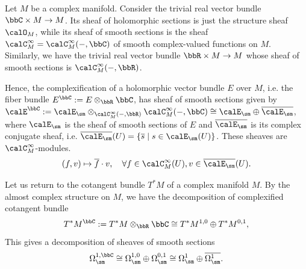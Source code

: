     \begin{example}\label{eg:real_trivial_bundle_C_as_sheaves}
        Let \(M\) be a complex manifold.
        Consider the trivial real vector bundle \(\bbC \times M \to M\).
        Its sheaf of holomorphic sections is just the structure sheaf \(\calO_M\),
        while its sheaf of smooth sections is the sheaf \(\calC_M^\infty = \calC_M^\infty(-,\bbC)\) of smooth complex-valued functions on \(M\).
        Similarly, we have the trivial real vector bundle \(\bbR \times M \to M\) whose sheaf of smooth sections is \(\calC_M^\infty(-,\bbR)\).

        Hence, the complexification of a holomorphic vector bundle \(E\) over \(M\), i.e. the fiber bundle \(E^\bbC := E \otimes_\bbR \bbC\),
        has sheaf of smooth sections given by \(\calE^\bbC := \calE_\sm \otimes_{\calC_M^\infty(-,\bbR)} \calC_M^\infty(-,\bbC) \cong \calE_\sm \oplus \overline{\calE_\sm}\),
        where \(\calE_\sm\) is the sheaf of smooth sections of \(E\) and \(\overline{\calE_\sm}\) is its complex conjugate sheaf, i.e. \(\overline{\calE_\sm}(U) = \{ \overline{s} \mid s \in \calE_\sm(U) \}\).
        These sheaves are \(\calC_M^\infty\)-modules.
        \[ (f, v) \mapsto \overline{f} \cdot v, \quad \forall f \in \calC_M^\infty(U), v \in \overline{\calE_\sm}(U). \]
    \end{example}

    Let us return to the cotangent bundle \(T^*M\) of a complex manifold \(M\).
    By the almost complex structure on \(M\), we have the decomposition of complexified cotangent bundle
    \[ T^*M^\bbC := T^*M \otimes_\bbR \bbC \cong T^*M^{1,0} \oplus T^*M^{0,1}, \]
    This gives a decomposition of sheaves of smooth sections
    \[ \Omega_{\sm}^{1,\bbC} \cong \Omega_{\sm}^{1,0} \oplus \Omega_{\sm}^{0,1} \cong \Omega_{\sm}^1 \oplus \overline{\Omega_{\sm}^1}. \]



